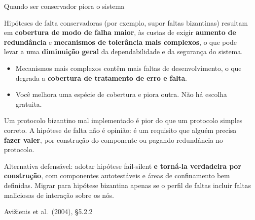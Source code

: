 \documentclass{beamer}
\newcommand{\sect}[1]{\par\smallskip\hfill{\tiny\color{black!55}Avi\v{z}ienis et al.\ (2004), #1}}
\begin{document}
\begin{frame}{Quando ser conservador piora o sistema}
    \footnotesize
    \begin{defi}
        \scriptsize
        Hip\'oteses de falta conservadoras (por exemplo, supor faltas bizantinas) resultam em \textbf{cobertura de modo de falha maior}, \`as custas de exigir \textbf{aumento de redund\^ancia} e \textbf{mecanismos de toler\^ancia mais complexos}, o que pode levar a uma \textbf{diminui\c{c}\~ao geral} da dependabilidade e da seguran\c{c}a do sistema.
    \end{defi}
    \medskip
    \begin{itemize}
        \item Mecanismos mais complexos cont\^em mais faltas de desenvolvimento, o que degrada a \textbf{cobertura de tratamento de erro e falta}.
        \item Voc\^e melhora uma esp\'ecie de cobertura e piora outra. N\~ao h\'a escolha gratuita.
    \end{itemize}
    \medskip
    \begin{ancora}
        \footnotesize
        Um protocolo bizantino mal implementado \'e pior do que um protocolo simples correto. A hip\'otese de falta n\~ao \'e opini\~ao: \'e um requisito que algu\'em precisa \textbf{fazer valer}, por constru\c{c}\~ao do componente ou pagando redund\^ancia no protocolo.
    \end{ancora}
    \medskip
    \begin{pratica}
        \scriptsize
        Alternativa defens\'avel: adotar hip\'otese fail-silent \textbf{e torn\'a-la verdadeira por constru\c{c}\~ao}, com componentes autotest\'aveis e \'areas de confinamento bem definidas. Migrar para hip\'otese bizantina apenas se o perfil de faltas incluir faltas maliciosas de intera\c{c}\~ao sobre os n\'os.
    \end{pratica}
    \sect{\S5.2.2}
\end{frame}
\end{document}
